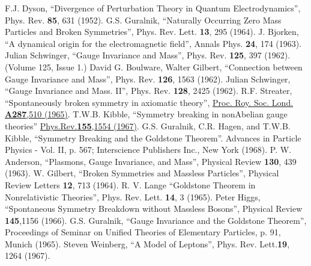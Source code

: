 \documentclass[12pt]{article}
\begin{document}
\begin{thebibliography}{99}
 F.J. Dyson, ``Divergence of Perturbation Theory in Quantum
  Electrodynamics'', Phys. Rev. {\bf 85}, 631 (1952).
 G.S. Guralnik, ``Naturally Occurring Zero Mass Particles and Broken
Symmetries'',  Phys. Rev. Lett. {\bf 13}, 295 (1964).
 J. Bjorken, ``A dynamical origin for the electromagnetic field'',
  Annals Phys. {\bf 24}, 174 (1963).
 Julian Schwinger, ``Gauge Invariance and Mass'',
  Phys. Rev. {\bf 125}, 397 (1962). (Volume 125, Issue 1.)
 David G. Boulware, Walter Gilbert, ``Connection between Gauge
  Invariance and Mass'', Phys. Rev. {\bf 126}, 1563 (1962).
 Julian Schwinger, ``Gauge Invariance and Mass. II'',
  Phys. Rev. {\bf 128}, 2425 (1962).
 R.F. Streater, ``Spontaneously broken symmetry in axiomatic
  theory'', \href{http://www.jstor.org/stable/2415037}{Proc. Roy. Soc. Lond. {\bf A287},510 (1965)}.
 T.W.B. Kibble, ``Symmetry breaking in nonAbelian gauge theories''
  \href{http://link.aps.org/doi/10.1103/PhysRev.155.1554}{Phys.Rev.{\bf155},1554 (1967)}. 
 G.S. Guralnik, C.R. Hagen, and T.W.B. Kibble, ``Symmetry
  Breaking and the Goldstone Theorem''.
  {Advances in Particle Physics - Vol. II}, p. 567; Interscience
  Publishers Inc., New York (1968).
 P. W. Anderson, ``Plasmons, Gauge Invariance, and Mass'',
  Physical Review {\bf 130}, 439 (1963).
 W. Gilbert, ``Broken Symmetries and Massless Particles'',
  Physical Review Letters {\bf 12}, 713 (1964).
 R. V. Lange ``Goldstone Theorem in Nonrelativistic
  Theories'', Phys. Rev. Lett. {\bf 14}, 3 (1965).
 Peter Higgs, ``Spontaneous Symmetry Breakdown without
  Massless Bosons'', Physical Review {\bf  145},1156 (1966).
 G.S. Guralnik, ``Gauge Invariance and the Goldstone Theorem'',
  Proceedings of Seminar on Unified Theories of Elementary Particles, p. 91,
  Munich (1965).
 Steven Weinberg, ``A Model of Leptons'', Phys. Rev. Lett.{\bf 19}, 1264
  (1967).
\end{thebibliography}
\end{document}
